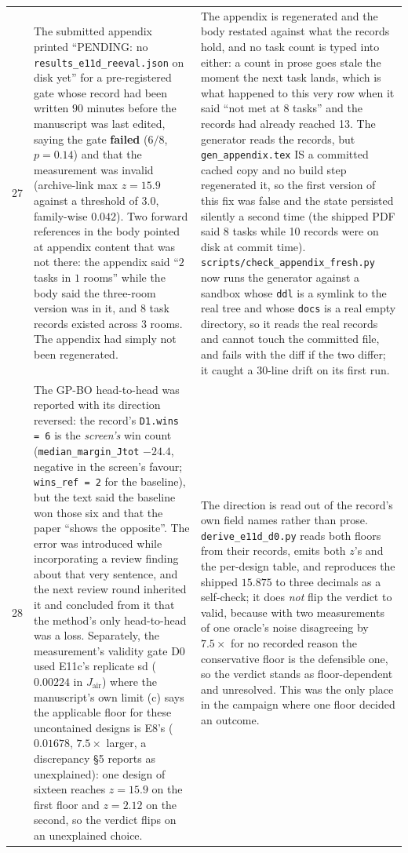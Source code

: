 \documentclass{article}
\newcommand{\Jair}{J_{\mathrm{air}}}
\begin{document}
\begin{table}[p]
\begin{tabular}{@{}p{0.6cm}p{7.3cm}p{7.3cm}@{}}
27 & The submitted appendix printed ``PENDING: no \texttt{results\_e11d\_reeval.json} on disk yet'' for a pre-registered gate whose record had been written $90$ minutes before the manuscript was last edited, saying the gate \textbf{failed} ($6/8$, $p = 0.14$) and that the measurement was invalid (archive-link max $z = 15.9$ against a threshold of $3.0$, family-wise $0.042$).  Two forward references in the body pointed at appendix content that was not there: the appendix said ``$2$ tasks in $1$ rooms'' while the body said the three-room version was in it, and $8$ task records existed across $3$ rooms.  The appendix had simply not been regenerated. & The appendix is regenerated and the body restated against what the records hold, and no task count is typed into either: a count in prose goes stale the moment the next task lands, which is what happened to this very row when it said ``not met at $8$ tasks'' and the records had already reached 13.  The generator reads the records, but \texttt{gen\_appendix.tex} IS a committed cached copy and no build step regenerated it, so the first version of this fix was false and the state persisted silently a second time (the shipped PDF said 8 tasks while 10 records were on disk at commit time).  \texttt{scripts/check\_appendix\_fresh.py} now runs the generator against a sandbox whose \texttt{ddl} is a symlink to the real tree and whose \texttt{docs} is a real empty directory, so it reads the real records and cannot touch the committed file, and fails with the diff if the two differ; it caught a 30-line drift on its first run. \\
28 & The GP-BO head-to-head was reported with its direction reversed: the record's \texttt{D1.wins = 6} is the \emph{screen's} win count (\texttt{median\_margin\_Jtot} $-24.4$, negative in the screen's favour; \texttt{wins\_ref = 2} for the baseline), but the text said the baseline won those six and that the paper ``shows the opposite''.  The error was introduced while incorporating a review finding about that very sentence, and the next review round inherited it and concluded from it that the method's only head-to-head was a loss.  Separately, the measurement's validity gate D0 used E11c's replicate sd ($0.00224$ in $\Jair$) where the manuscript's own limit (c) says the applicable floor for these uncontained designs is E8's ($0.01678$, $7.5\times$ larger, a discrepancy \S5 reports as unexplained): one design of sixteen reaches $z = 15.9$ on the first floor and $z = 2.12$ on the second, so the verdict flips on an unexplained choice. & The direction is read out of the record's own field names rather than prose.  \texttt{derive\_e11d\_d0.py} reads both floors from their records, emits both $z$'s and the per-design table, and reproduces the shipped $15.875$ to three decimals as a self-check; it does \emph{not} flip the verdict to valid, because with two measurements of one oracle's noise disagreeing by $7.5\times$ for no recorded reason the conservative floor is the defensible one, so the verdict stands as floor-dependent and unresolved.  This was the only place in the campaign where one floor decided an outcome. \\

\end{tabular}
\end{table}
\end{document}
